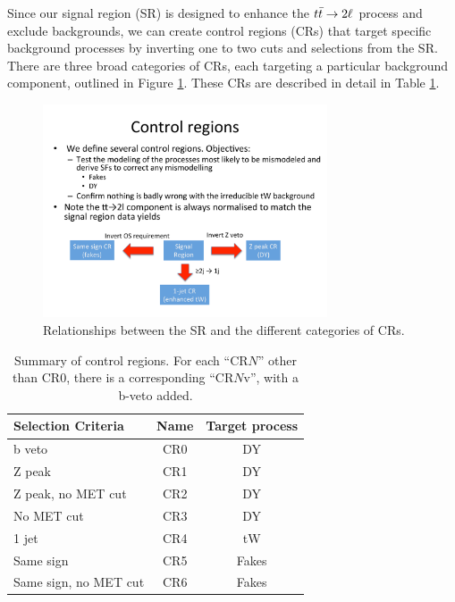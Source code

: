 Since our signal region (SR) is designed to enhance the $t\bar{t} \rightarrow 2\ell$
process and exclude backgrounds, we can create control regions (CRs)
that target specific background processes by inverting one to two cuts
and selections from the SR. There are three broad categories of CRs,
each targeting a particular background component,
outlined in Figure \ref{fig:afb:crs}. These CRs are described in
detail in Table \ref{tab:afb:crdefs}.

\vspace{0.25in}
\begin{figure}[t]
  \centering
  \includegraphics[width=0.75\textwidth]{figures/CRsdef.pdf}
  \caption{Relationships between the SR and the different categories of CRs.}
  \label{fig:afb:crs}
\end{figure}


\begin{table}[h]
\begin{center}
\caption{Summary of control regions. For each ``CR$N$'' other than
  CR0, there is a corresponding ``CR$N$v'', with a b-veto added.}
\label{tab:afb:crdefs}
{\small
\begin{tabular}{l|c c}
\hline
Selection Criteria & Name & Target process  \\
\hline
b veto & CR0 & DY \\
\hline
Z peak & CR1 & DY \\
\hline
Z peak, no MET cut & CR2 & DY \\
\hline
No MET cut & CR3 & DY \\
\hline
1 jet & CR4 & tW  \\
\hline
Same sign & CR5 & Fakes \\
\hline
Same sign, no MET cut & CR6 & Fakes \\
\hline
\end{tabular}
}
\end{center}
\end{table}

